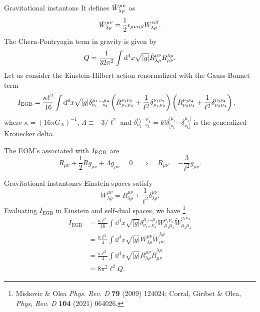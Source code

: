 \documentclass[aspectratio=169,xcolor=dvipsnames]{beamer}
\begin{document}
\begin{frame}{Gravitational instantons}\justifying
    It defines $\Tilde{W}^{\mu\nu}_{\lambda\rho}$ as
    \begin{equation*}
        \Tilde{W}^{\mu\nu}_{\lambda\rho}=\frac{1}{2}\epsilon_{\mu\nu\alpha\beta}W^{\alpha\beta}_{\lambda\rho}.
    \end{equation*}
   The Chern-Pontryagin term in gravity is given by
    \begin{equation*}
        Q=\frac{1}{32\pi^2}\int\dd^4x\sqrt{|g|}\Tilde{R}^{\mu\nu}_{\lambda\rho}R^{\lambda\rho}_{\mu\nu}.
    \end{equation*}
Let us consider the Einstein-Hilbert action renormalized with the Gauss-Bonnet term
\begin{align*}
    I_{\rm EGB}
    &=\frac{\kappa \ell^2}{16}\int\dd^4x\sqrt{|g|}\delta^{\mu_1...\mu_4}_{\nu_1...\nu_4}\left(R^{\nu_1\nu_2}_{\mu_1\mu_2}+\frac{1}{\ell^2}\delta^{\nu_1\nu_2}_{\mu_1\mu_2}\right)\left(R^{\nu_3\nu_4}_{\mu_3\mu_4}+\frac{1}{\ell^2}\delta^{\nu_3\nu_4}_{\mu_3\mu_4}\right),
\end{align*}
where $\kappa=(16\pi G_N)^{-1}$, $\Lambda\equiv-3/\ell^2$ and $\delta^{\mu_1\cdots\mu_k}_{\nu_1\cdots\nu_k}=k!\delta^{[\mu_1}_{[\nu_1}\cdots\delta^{\mu_k]}_{\nu_k]}$ is the generalized Kronecker delta. 

The EOM's associated with $I_{\rm EGB}$ are
\begin{equation*}
    R_{\mu\nu}+\frac{1}{2}Rg_{\mu\nu}+\Lambda g_{\mu\nu}=0\quad \Rightarrow \quad R_{\mu\nu}=-\frac{3}{\ell ^2}g_{\mu\nu}.
\end{equation*}
\end{frame}

\begin{frame}{Gravitational instantones}\justifying
    Einstein spaces satisfy
    \begin{equation*}
        W^{\mu\nu}_{\lambda\rho}=R^{\mu\nu}_{\lambda\rho}+\frac{1}{\ell^2}\delta^{\mu\nu}_{\lambda\rho}.
    \end{equation*}
    Evaluating $I_{\text{EGB}}$ in Einstein and self-dual spaces, we have \footnote{Miskovic \& Olea \textit{Phys. Rev. D} \textbf{79} (2009) 124024; Corral, Giribet \& Olea, \textit{Phys, Rev. D} \textbf{104} (2021) 064026.}
    \begin{align*}
        I_{\text{EGB}}&=\frac{\kappa \ell^2}{16}\int\dd^4x\sqrt{|g|}\delta^{\mu_1...\mu_4}_{\nu_1...\nu_4}W^{\nu_1\nu_2}_{\mu_1\mu_2}\tilde{W}^{\nu_3\nu_4}_{\mu_3\mu_4}\\
        &=\frac{\kappa \ell^2}{4}\int\dd^4x\sqrt{|g|}W^{\mu\nu}_{\lambda\rho}\tilde{W}^{\lambda\rho}_{\mu\nu}\\
        &=\frac{\kappa \ell^2}{4}\int\dd^4x\sqrt{|g|}R^{\mu\nu}_{\lambda\rho}\tilde{R}^{\lambda\rho}_{\mu\nu}\\
        &=8\pi^2\ell^2 Q.
    \end{align*}
\end{frame}
\end{document}
